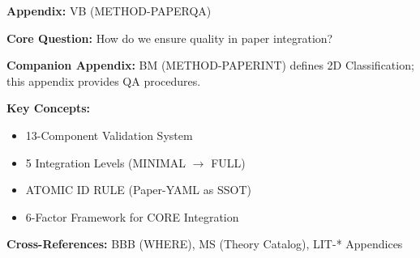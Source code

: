\begin{tcolorbox}[colback=blue!5!white, colframe=blue!75!black,
    title=Quick Reference: Appendix VB]

\textbf{Appendix:} VB (METHOD-PAPERQA)

\textbf{Core Question:} How do we ensure quality in paper integration?

\textbf{Companion Appendix:} BM (METHOD-PAPERINT) defines 2D Classification; this appendix provides QA procedures.

\textbf{Key Concepts:}
\begin{itemize}[nosep]
\item 13-Component Validation System
\item 5 Integration Levels (MINIMAL $\rightarrow$ FULL)
\item ATOMIC ID RULE (Paper-YAML as SSOT)
\item 6-Factor Framework for CORE Integration
\end{itemize}

\textbf{Cross-References:} BBB (WHERE), MS (Theory Catalog), LIT-* Appendices
\end{tcolorbox}

\begin{abstract}
This appendix defines the standardized Paper Integration Workflow for the
Evidence-Based Framework (EBF). It specifies five integration levels
(MINIMAL to FULL), the 13-component validation system, compliance thresholds,
and the 6-Factor Framework for deciding CORE appendix integration. The workflow
ensures consistent, high-quality paper integration with full traceability.
\end{abstract}



